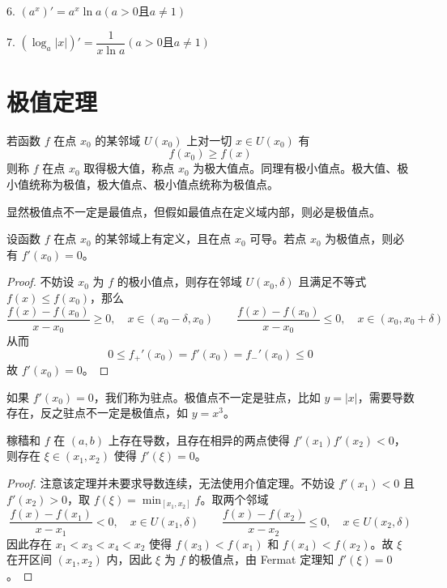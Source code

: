 6. $(a^x)'=a^x \ln a(a>0\text{且}a\ne 1)$

7. $(\log_a|x|)'=\dfrac{1}{x\ln a}(a>0\text{且}a\ne 1)$

\section{极值定理}

若函数 $f$ 在点 $x_0$ 的某邻域 $U(x_0)$ 上对一切 $x\in U(x_0)$ 有
\[ f(x_0) \geqslant f(x) \]
则称 $f$ 在点 $x_0$ 取得极大值，称点 $x_0$ 为极大值点。同理有极小值点。极大值、极小值统称为极值，极大值点、极小值点统称为极值点。

显然极值点不一定是最值点，但假如最值点在定义域内部，则必是极值点。

\begin{theorem}[Fermat 定理]
	设函数 $f$ 在点 $x_0$ 的某邻域上有定义，且在点 $x_0$ 可导。若点 $x_0$ 为极值点，则必有 $f'(x_0)=0$。
\end{theorem}

\begin{proof}
	不妨设 $x_0$ 为 $f$ 的极小值点，则存在邻域 $U(x_0, \delta)$ 且满足不等式 $f(x) \leqslant f(x_0)$，那么
	\[ \frac{f(x) - f(x_0)}{x - x_0} \geqslant 0, \quad x \in (x_0 - \delta, x_0) \qquad
		\frac{f(x) - f(x_0)}{x - x_0} \leqslant 0, \quad x \in (x_0, x_0 + \delta) \]
	从而
	\[ 0 \leqslant f_+'(x_0) = f'(x_0) = f_-'(x_0) \leqslant 0 \]
	故 $f'(x_0) = 0$。
\end{proof}

如果 $f'(x_0) = 0$，我们称为驻点。极值点不一定是驻点，比如 $y = |x|$，需要导数存在，反之驻点不一定是极值点，如 $y = x^3$。

\begin{theorem}[Darboux 定理]
	稼穑和 $f$ 在 $(a, b)$ 上存在导数，且存在相异的两点使得 $f'(x_1)f'(x_2) < 0$，则存在 $\xi \in (x_1, x_2)$ 使得 $f'(\xi) = 0$。
\end{theorem}

\begin{proof}
	注意该定理并未要求导数连续，无法使用介值定理。不妨设 $f'(x_1) < 0$ 且 $f'(x_2) > 0$，取 $f(\xi) = \min_{[x_1, x_2]} f$。取两个邻域
	\[ \frac{f(x) - f(x_1)}{x - x_1} < 0, \quad x \in U(x_1, \delta) \qquad
		\frac{f(x) - f(x_2)}{x - x_2} \leqslant 0, \quad x \in U(x_2, \delta) \]
	因此存在 $x_1 < x_3 < x_4 < x_2$ 使得 $f(x_3) < f(x_1)$ 和 $f(x_4) < f(x_2)$。故 $\xi$ 在开区间 $(x_1, x_2)$ 内，因此 $\xi$ 为 $f$ 的极值点，由 Fermat 定理知 $f'(\xi) = 0$。
\end{proof}

